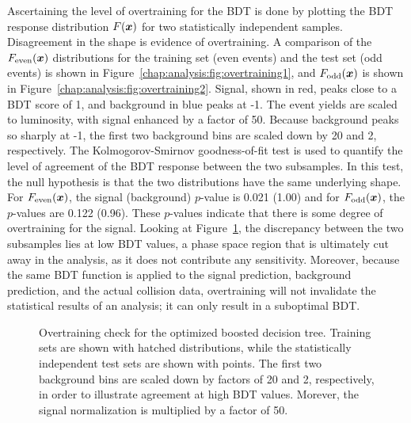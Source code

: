 Ascertaining the level of overtraining for the BDT is done by plotting
the BDT response distribution $F(\boldsymbol{x})$ for two statistically
independent samples. Disagreement in the shape is evidence of
overtraining. A comparison of the $F_{\textrm{even}}(\boldsymbol{x})$ distributions for the
training set (even events) and the test set (odd events) is
shown in Figure~\ref{chap:analysis:fig:overtraining1}, and
$F_{\textrm{odd}}(\boldsymbol{x})$ is shown in
Figure~\ref{chap:analysis:fig:overtraining2}. Signal, shown
in red, peaks close to a BDT score of 1, and background in blue peaks
at -1. The event yields are scaled to luminosity, with signal enhanced
by a factor of 50. Because background peaks so sharply at -1, the
first two background bins are scaled down by 20 and 2,
respectively. The Kolmogorov-Smirnov goodness-of-fit test is used to
quantify the level of agreement of the BDT response between the two
subsamples. In this test, the null hypothesis is that the two
distributions have the same underlying shape. For $F_{\textrm{even}}(\boldsymbol{x})$, the signal
(background) $p$-value is 0.021 (1.00) and for $F_{\textrm{odd}}(\boldsymbol{x})$, the $p$-values
are 0.122 (0.96). These $p$-values indicate that there is some degree
of overtraining for the signal. Looking at
Figure~\ref{chap:analysis:fig:overtraining}, the discrepancy
between the two subsamples lies at low BDT values, a phase space
region that is ultimately cut away in the analysis, as it does not
contribute any sensitivity. Moreover, because the
same BDT function is applied to the signal prediction, background
prediction, and the actual collision data, overtraining will not
invalidate the statistical results of an analysis; it can only result
in a suboptimal BDT.

\begin{figure}[h]
    \centering
    \caption[Boosted decision tree overtraining check.]{Overtraining
      check for the optimized boosted decision tree. Training sets are shown
    with hatched distributions, while the statistically independent test sets
    are shown with points. The first two background bins are scaled
    down by factors of 20 and 2, respectively, in order to illustrate
    agreement at high BDT values. Morever, the signal normalization is multiplied by a factor
    of 50.}
\label{chap:analysis:fig:overtraining}
\end{figure}

